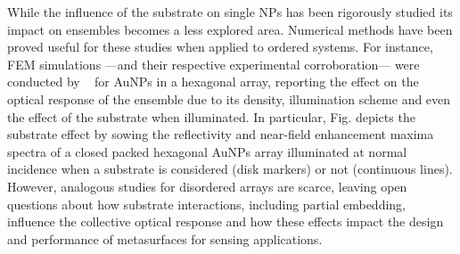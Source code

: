 While the influence of the substrate on single NPs has been rigorously studied \cite{lerme_optical_2013,bosi_optical_1996,zhang_multiple-reflection_2020} its impact on ensembles becomes a less explored area. Numerical methods have been proved useful for these studies when applied to ordered systems. For  instance,  FEM simulations  ---and their respective experimental corroboration---  were conducted by \citeauthor*{borah_plasmon_2022}~\cite{borah_plasmon_2022}  for AuNPs in a hexagonal array, reporting the effect on the  optical response of the ensemble due to its density, illumination scheme and even the effect of the substrate when illuminated. In particular,  Fig.  depicts the substrate effect by sowing the reflectivity and near-field enhancement maxima spectra  of a closed packed hexagonal AuNPs array illuminated at normal incidence when a substrate is considered (disk markers) or not (continuous lines). However, analogous studies for disordered arrays are scarce, leaving open questions about how substrate interactions, including partial embedding, influence the collective optical response and how these effects impact the design and performance of metasurfaces for sensing applications.